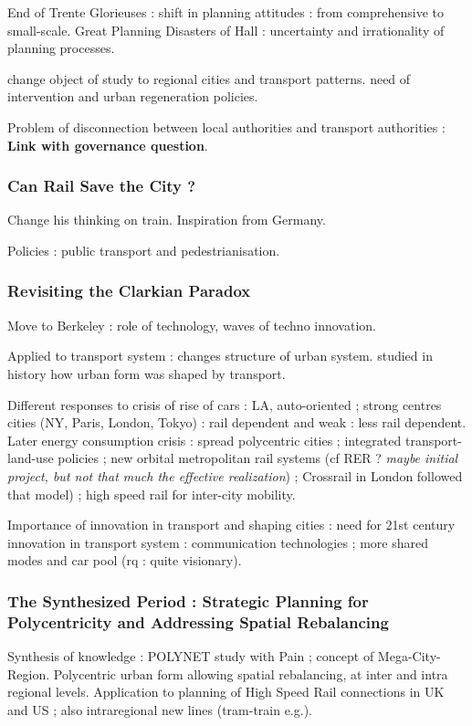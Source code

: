 End of Trente Glorieuses : shift in planning attitudes : from comprehensive to small-scale. Great Planning Disasters of Hall : uncertainty and irrationality of planning processes.

change object of study to regional cities and transport patterns. need of intervention and urban regeneration policies.

Problem of disconnection between local authorities and transport authorities : \textbf{Link with governance question}.


\subsubsection{Can Rail Save the City ?}

Change his thinking on train. Inspiration from Germany.

Policies : public transport and pedestrianisation.

\subsubsection{Revisiting the Clarkian Paradox}

Move to Berkeley : role of technology, waves of techno innovation.

Applied to transport system : changes structure of urban system. studied in history how urban form was shaped by transport.

Different responses to crisis of rise of cars : LA, auto-oriented ; strong centres cities (NY, Paris, London, Tokyo) : rail dependent and weak : less rail dependent. Later energy consumption crisis : spread polycentric cities ; integrated transport-land-use policies ; new orbital metropolitan rail systems (cf RER ? \textit{maybe initial project, but not that much the effective realization}) ; Crossrail in London followed that model) ; high speed rail for inter-city mobility.

Importance of innovation in transport and shaping cities : need for 21st century innovation in transport system : communication technologies ; more shared modes and car pool (rq : quite visionary).

\subsubsection{The Synthesized Period : Strategic Planning for Polycentricity and Addressing Spatial Rebalancing}

Synthesis of knowledge : POLYNET study with Pain ; concept of Mega-City-Region. Polycentric urban form allowing spatial rebalancing, at inter and intra regional levels. Application to planning of High Speed Rail connections in UK and US ; also intraregional new lines (tram-train e.g.).



